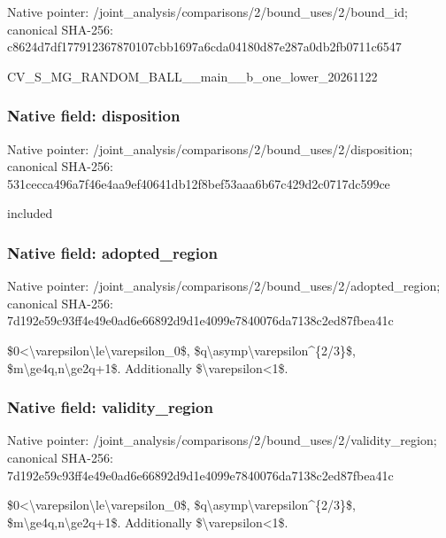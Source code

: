\documentclass[10pt,a4paper]{article}
\begin{document}
Native pointer: /joint\_analysis/comparis\allowbreak{}ons/2/bound\_uses/2/bound\allowbreak{}\_id; canonical SHA-256: c8624d7df177912367870107\allowbreak{}cbb1697a6cda04180d87e287\allowbreak{}a0db2fb0711c6547


CV\_S\_MG\_RANDOM\_BALL\_\_mai\allowbreak{}n\_\_b\_one\_lower\_20261122


\subsubsection{Native field: disposition}


Native pointer: /joint\_analysis/comparis\allowbreak{}ons/2/bound\_uses/2/dispo\allowbreak{}sition; canonical SHA-256: 531cecca496a7f46e4aa9ef4\allowbreak{}0641db12f8bef53aaa6b67c4\allowbreak{}29d2c0717dc599ce


included


\subsubsection{Native field: adopted\_region}


Native pointer: /joint\_analysis/comparis\allowbreak{}ons/2/bound\_uses/2/adopt\allowbreak{}ed\_region; canonical SHA-256: 7d192e59c93ff4e49e0ad6e6\allowbreak{}6892d9d1e4099e7840076da7\allowbreak{}138c2ed87fbea41c


\$0<\textbackslash{}varepsilon\textbackslash{}le\textbackslash{}varepsilon\_0\$, \$q\textbackslash{}asymp\textbackslash{}varepsilon\textasciicircum{}\{2/3\}\$, \$m\textbackslash{}ge4q,n\textbackslash{}ge2q+1\$. Additionally \$\textbackslash{}varepsilon<1\$.


\subsubsection{Native field: validity\_region}


Native pointer: /joint\_analysis/comparis\allowbreak{}ons/2/bound\_uses/2/valid\allowbreak{}ity\_region; canonical SHA-256: 7d192e59c93ff4e49e0ad6e6\allowbreak{}6892d9d1e4099e7840076da7\allowbreak{}138c2ed87fbea41c


\$0<\textbackslash{}varepsilon\textbackslash{}le\textbackslash{}varepsilon\_0\$, \$q\textbackslash{}asymp\textbackslash{}varepsilon\textasciicircum{}\{2/3\}\$, \$m\textbackslash{}ge4q,n\textbackslash{}ge2q+1\$. Additionally \$\textbackslash{}varepsilon<1\$.
\end{document}
